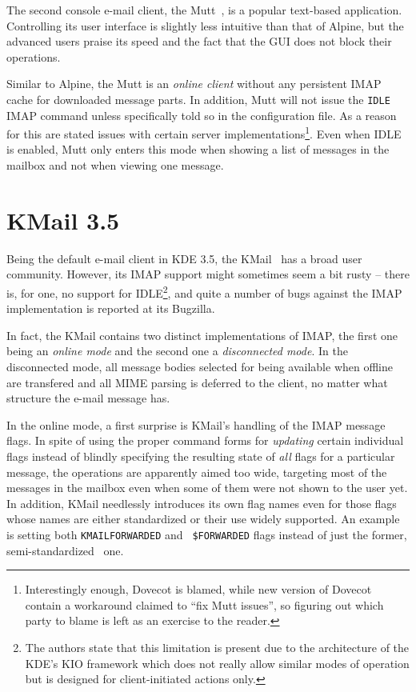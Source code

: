 \documentclass[12pt,notitlepage]{report}
\begin{document}
The second console e-mail client, the Mutt~\cite{mutt}, is a popular text-based
application.  Controlling its user interface is slightly less intuitive than
that of Alpine, but the advanced users praise its speed and the fact that the
GUI does not block their operations.

Similar to Alpine, the Mutt is an {\em online client} without any persistent
IMAP cache for downloaded message parts.  In addition, Mutt will not issue the
{\tt IDLE} IMAP command unless specifically told so in the configuration file.
As a reason for this are stated issues with certain server
implementations\footnote{Interestingly enough, Dovecot is blamed, while new
version of Dovecot contain a workaround claimed to ``fix Mutt issues'', so
figuring out which party to blame is left as an exercise to the reader.}.  Even
when IDLE is enabled, Mutt only enters this mode when showing a list of
messages in the mailbox and not when viewing one message.

\section{KMail 3.5}

Being the default e-mail client in KDE 3.5, the KMail~\cite{kmail} has a broad
user community.  However, its IMAP support might sometimes seem a bit rusty --
there is, for one, no support for IDLE\footnote{The authors state that this
limitation is present due to the architecture of the KDE's KIO framework which
does not really allow similar modes of operation but is designed for
client-initiated actions only.}, and quite a number of bugs against the IMAP
implementation is reported at its Bugzilla.

In fact, the KMail contains two distinct implementations of IMAP, the first one
being an {\em online mode} and the second one a {\em disconnected mode}.  In the
disconnected mode, all message bodies selected for being available when offline
are transfered and all MIME parsing is deferred to the client, no matter what
structure the e-mail message has.

In the online mode, a first surprise is KMail's handling of the IMAP message
flags.  In spite of using the proper command forms for {\em updating} certain
individual flags instead of blindly specifying the resulting state of {\em all}
flags for a particular message, the operations are apparently aimed too wide,
targeting most of the messages in the mailbox even when some of them were not
shown to the user yet.  In addition, KMail needlessly introduces its own flag
names even for those flags whose names are either standardized or their use
widely supported.  An example is setting both {\tt KMAILFORWARDED} and {\tt
\$FORWARDED} flags instead of just the former,
semi-standardized~\cite{imap-keywords-flags} one.
\end{document}
